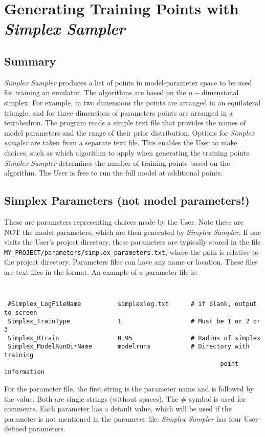 \documentclass[UserManual.tex]{subfiles}
\begin{document}
\setcounter{section}{2}

\section{Generating Training Points with {\it Simplex Sampler}}\label{sec:simplex}

\subsection{Summary}
{\it Simplex Sampler} produces a list of points in model-parameter space to be used for training an emulator. The algorithms are based on the $n-$dimensional simplex. For example, in two dimensions the points are arranged in an equilateral triangle, and for three dimensions of parameters points are arranged in a tetrahedron. The program reads a simple text file that provides the names of model parameters and the range of their prior distribution. Options for {\it Simplex sampler} are taken from a separate text file. This enables the User to make choices, such as which algorithm to apply when generating the training points. {\it Simplex Sampler} determines the number of training points based on the algorithm. The User is free to run the full model at additional points.

\subsection{Simplex Parameters (not model parameters!)}

These are parameters representing choices made by the User. Note these are NOT the model parameters, which are then generated by {\it Simplex Sampler}. If one visits the User's project directory, these parameters are typically stored in the file   {\tt MY\_PROJECT/parameters/simplex\_parameters.txt}, where the path is relative to the project directory.
Parameters files can have any name or location. These files are text files in the format. An example of a parameter file is:
{\tt
\begin{verbatim}
 #Simplex_LogFileName          simplexlog.txt      # if blank, output to screen
 Simplex_TrainType             1                   # Must be 1 or 2 or 3
 Simplex_RTrain                0.95                # Radius of simplex
 Simplex_ModelRunDirName       modelruns           # Directory with training
                                                           point information
\end{verbatim}
}
For the parameter file, the first string is the parameter name and is followed by the value. Both are single strings (without spaces). The \# symbol is used for comments. Each parameter has a default value, which will be used if the parameter is not mentioned in the parameter file.  {\it Simplex Sampler} has four User-defined parameters.
    
\end{document}
